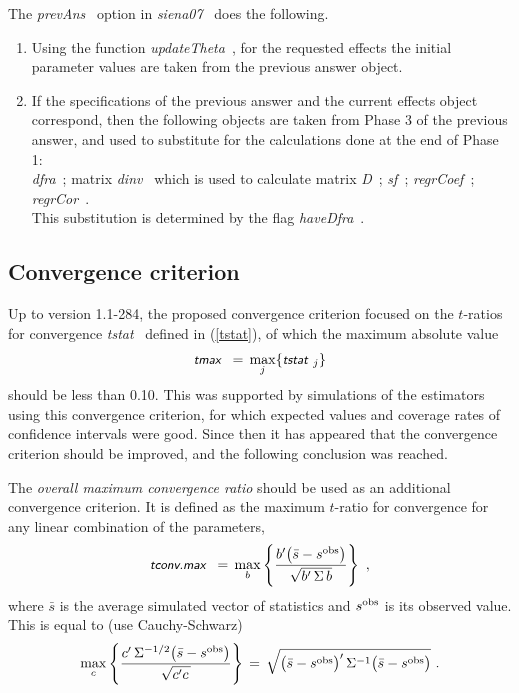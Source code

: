 \documentclass[a4paper,12pt,fleqn]{article}
\newcommand{\nnm}[1]{\textsf{\small\textit{#1}\ }}
\begin{document}
The \nnm{prevAns} option in \nnm{siena07} does the following.
\begin{enumerate}
\item Using the function \nnm{updateTheta}, for the requested effects
   the initial parameter values are taken from the previous
   answer object.
\item If the specifications of the previous answer and the current
  effects object correspond, then the following objects are taken from
  Phase 3 of the previous answer, and used to substitute for the calculations
  done at the end of Phase 1:\\
  \nnm{dfra};
  matrix \nnm{dinv} which is used to calculate matrix \nnm{D};
  \nnm{sf};
  \nnm{regrCoef};
  \nnm{regrCor}. \\
  This substitution is determined by the flag \nnm{haveDfra}.
\end{enumerate}

\subsection{Convergence criterion}

Up to version 1.1-284, the proposed convergence criterion focused on
the $t$-ratios for convergence \nnm{tstat} defined in (\ref{tstat}),
of which the maximum absolute value
\[
    \nnm{tmax} \,=\,  \max_j\{ \nnm{tstat}_j \}
\]
 should be less than 0.10.
This was supported by simulations of the estimators using this
convergence criterion, for which expected values and coverage rates of
confidence intervals were good.
Since then it has appeared that the convergence criterion should be improved,
and the following conclusion was reached.

The \emph{overall maximum convergence ratio} should be used as an additional
convergence criterion. It is defined as the maximum $t$-ratio for convergence for
any linear combination of the parameters,
\begin{equation}
           \nnm{tconv.max} \,=\, \max_{b}
           \left\{ \frac{b' \big(\bar{s} - s^{\rm{obs}}\big)}
           {\sqrt{b' \, \Sigma\, b}} \right\} \ , \label{tstatmax}
\end{equation}
where $\bar{s}$ is the average simulated vector of statistics and $s^{\rm{obs}}$
is its observed value.
This is equal to (use Cauchy-Schwarz)
\begin{equation}
  \max_{c} \left\{ \frac{c' \, \Sigma^{-1/2}  \big(\bar{s} - s^{\rm{obs}}\big)}
           {\sqrt{c'c\,}} \right\} \,=\,
          \sqrt{ \big(\bar{s} - s^{\rm{obs}}\big)'\,
           \Sigma^{-1}  \big(\bar{s} - s^{\rm{obs}}\big) } \ .
\end{equation}
\end{document}
